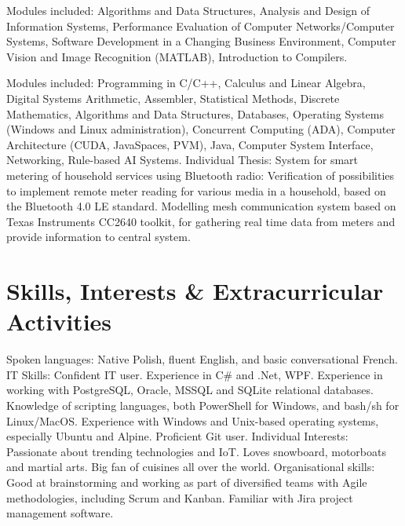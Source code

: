 \documentclass[12pt,english]{resume}
\begin{document}
			Modules included: Algorithms and Data Structures, Analysis and Design of Information Systems, Performance Evaluation of Computer Networks/Computer Systems, Software Development in a Changing Business Environment, Computer Vision and Image Recognition (MATLAB), Introduction to Compilers.

			Modules included: Programming in C/C++, Calculus and Linear Algebra, Digital Systems Arithmetic, Assembler, Statistical Methods, Discrete Mathematics, Algorithms and Data Structures, Databases,
			Operating Systems (Windows and Linux administration), Concurrent Computing (ADA), Computer Architecture (CUDA, JavaSpaces, PVM), Java, Computer System Interface, Networking, Rule-based AI Systems.
			Individual Thesis: System for smart metering of household services using Bluetooth radio:
			Verification of possibilities to implement remote meter reading for various media in a household, based on the Bluetooth 4.0 LE standard. Modelling mesh communication system based on Texas Instruments CC2640 toolkit, for gathering real time data from meters and provide information to central system.

	\section{Skills, Interests \& Extracurricular Activities}
		Spoken languages: Native Polish, fluent English, and basic conversational French.
		IT Skills: Confident IT user. Experience in C\# and .Net, WPF. Experience in working with PostgreSQL, Oracle, MSSQL and SQLite relational databases. Knowledge of scripting languages, both PowerShell for Windows, and bash/sh for Linux/MacOS. Experience with Windows and Unix-based operating systems, especially Ubuntu and Alpine. Proficient Git user.
		Individual Interests: Passionate about trending technologies and IoT. Loves snowboard, motorboats and martial arts. Big fan of cuisines all over the world.
		Organisational skills: Good at brainstorming and working as part of diversified teams with Agile methodologies, including Scrum and Kanban. Familiar with Jira project management software.
\end{document}
